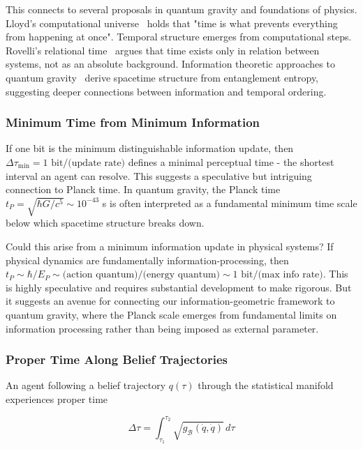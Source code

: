 \documentclass[11pt]{article}
\begin{document}
This connects to several proposals in quantum gravity and foundations of physics. Lloyd's computational universe~\cite{Lloyd2002} holds that "time is what prevents everything from happening at once". Temporal structure emerges from computational steps. Rovelli's relational time~\cite{Rovelli2004} argues that time exists only in relation between systems, not as an absolute background. Information theoretic approaches to quantum gravity~\cite{Jacobson1995} derive spacetime structure from entanglement entropy, suggesting deeper connections between information and temporal ordering.


\subsubsection{Minimum Time from Minimum Information}

If one bit is the minimum distinguishable information update, then $\Delta \tau_{\min} = 1 \text{ bit} / \text{(update rate)}$ defines a minimal perceptual time - the shortest interval an agent can resolve. This suggests a speculative but intriguing connection to Planck time. In quantum gravity, the Planck time $t_P = \sqrt{\hbar G/c^5} \sim 10^{-43}$ s is often interpreted as a fundamental minimum time scale below which spacetime structure breaks down.

Could this arise from a minimum information update in physical systems? If physical dynamics are fundamentally information-processing, then $t_P \sim \hbar/E_P \sim \text{(action quantum)}/\text{(energy quantum)} \sim 1 \text{ bit}/\text{(max info rate)}$. This is highly speculative and requires substantial development to make rigorous. But it suggests an avenue for connecting our information-geometric framework to quantum gravity, where the Planck scale emerges from fundamental limits on information processing rather than being imposed as external parameter.

\subsubsection{Proper Time Along Belief Trajectories}

An agent following a belief trajectory $q(\tau)$ through the statistical manifold experiences proper time

\begin{equation}
\Delta \tau = \int_{\tau_1}^{\tau_2} \sqrt{g_{\mathcal{B}}(\dot{q}, \dot{q})} \, d\tau
\end{equation}
\end{document}
